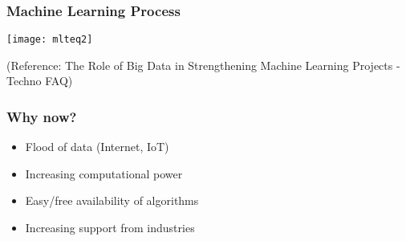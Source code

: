 \begin{frame}[fragile]\frametitle{Machine Learning Process}
\begin{center}
\texttt{[image: mlteq2]}
\end{center}
\tiny{(Reference: The Role of Big Data in Strengthening Machine Learning Projects - Techno FAQ)}
\end{frame}


\begin{frame}[fragile]\frametitle{Why now?}
\begin{itemize}
\item Flood of data (Internet, IoT)
\item Increasing computational power
\item Easy/free availability of algorithms 
\item Increasing support from industries
\end{itemize}
\end{frame}




